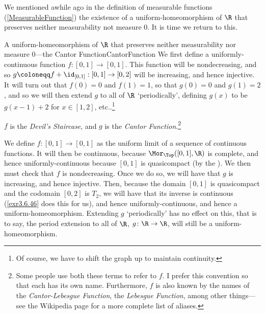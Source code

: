 We mentioned awhile ago in the definition of measurable functions (\cref{MeasurableFunction}) the existence of a uniform-homeomorphism of $\R$ that preserves neither measurability not measure $0$.  It is time we return to this.
\begin{exm}{A uniform-homeomorphism of $\R$ that preserves neither measurability nor measure $0$---the Cantor Function}{CantorFunction}
We first define a uniformly-continuous function $f\colon [0,1]\rightarrow [0,1]$.  This function will be nondecreasing, and so $g\coloneqq f+\id _{[0,1]}:[0,1]\rightarrow [0,2]$ will be increasing, and hence injective.  It will turn out that $f(0)=0$ and $f(1)=1$, so that $g(0)=0$ and $g(1)=2$, and so we will then extend $g$ to all of $\R$ `periodically', defining $g(x)$ to be $g(x-1)+2$ for $x\in [1,2]$, etc..\footnote{Of course, we have to shift the graph up to maintain continuity.} 
\begin{rmk}
$f$ is the \emph{Devil's Staircase}, and $g$ is the \emph{Cantor Function}.\footnote{Some people use both these terms to refer to $f$.  I prefer this convention so that each has its own name.  Furthermore, $f$ is also known by the names of the \emph{Cantor-Lebesgue Function}, the \emph{Lebesgue Function}, among other things---see the Wikipedia page for a more complete list of aliases.}
\end{rmk}

We define $f\colon [0,1]\rightarrow [0,1]$ as the uniform limit of a sequence of continuous functions.  It will then be continuous, because $\Mor _{\Top}([0,1],\R )$ is complete, and hence uniformly-continuous because $[0,1]$ is quasicompact (by the ).  We then must check that $f$ is nondecreasing.  Once we do so, we will have that $g$ is increasing, and hence injective.  Then, because the domain $[0,1]$ is quasicompact and the codomain $[0,2]$ is $T_2$, we will have that its inverse is continuous (\cref{exr3.6.46} does this for us), and hence uniformly-continuous, and hence a uniform-homeomorphism.  Extending $g$ `periodically' has no effect on this, that is to say, the period extension to all of $\R$, $g\colon \R \rightarrow \R$, will still be a uniform-homeomorphism.


\end{exm}
